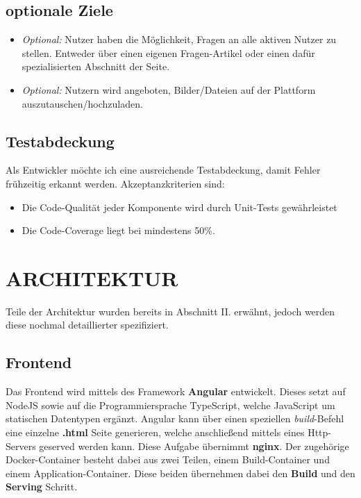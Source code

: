 \documentclass[letterpaper, 10 pt, conference]{ieeeconf}  %
\begin{document}
\subsection{optionale Ziele}
\begin{itemize}
\item \textit{Optional:} Nutzer haben die Möglichkeit, Fragen an alle aktiven Nutzer zu stellen. Entweder über einen eigenen Fragen-Artikel oder einen dafür spezialisierten Abschnitt der Seite.
\item \textit{Optional:} Nutzern wird angeboten, Bilder/Dateien auf der Plattform auszutauschen/hochzuladen.
\end{itemize}

\subsection{Testabdeckung}
Als Entwickler möchte ich eine ausreichende Testabdeckung, damit Fehler frühzeitig erkannt werden. Akzeptanzkriterien sind:
\begin{itemize}
\item Die Code-Qualität jeder Komponente wird durch Unit-Tests gewährleistet
\item Die Code-Coverage liegt bei mindestens 50\%.
\end{itemize}


\section{ARCHITEKTUR}

Teile der Architektur wurden bereits in Abschnitt II. erwähnt, jedoch werden diese nochmal detaillierter spezifiziert.

\subsection{Frontend}
Das Frontend wird mittels des Framework \textbf{Angular} entwickelt. Dieses setzt auf NodeJS sowie auf die Programmiersprache TypeScript, welche JavaScript um statischen Datentypen ergänzt. 
Angular kann über einen speziellen \textit{build}-Befehl eine einzelne \textbf{.html} Seite generieren, welche anschließend mittels eines Http-Servers geserved werden kann. Diese Aufgabe übernimmt \textbf{nginx}.
Der zugehörige Docker-Container besteht dabei aus zwei Teilen, einem Build-Container und einem Application-Container. Diese beiden übernehmen dabei den  \textbf{Build} und den \textbf{Serving} Schritt.
\end{document}
